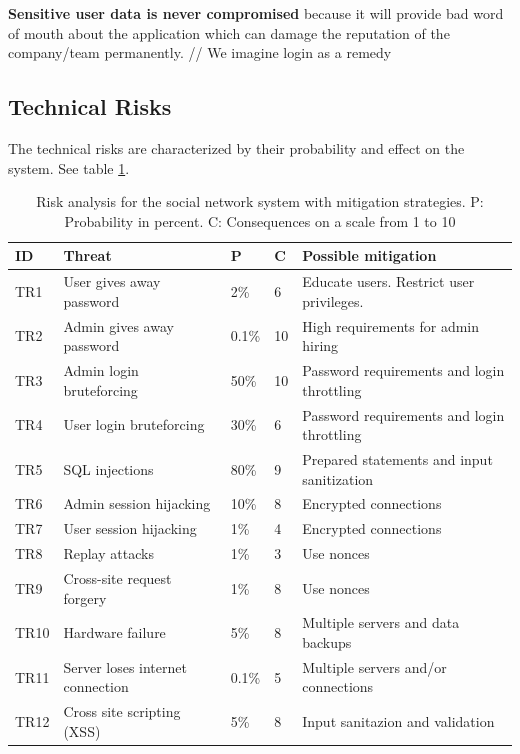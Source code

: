 \documentclass[a4paper]{article}
\begin{document}
\textbf{Sensitive user data is never compromised} because it will provide bad word of mouth about the application which can damage the reputation of the company/team permanently.
// We imagine login as a remedy



\subsection{Technical Risks}
The technical risks are characterized by their probability and effect on the system. See table \ref{tab:risk_analysis}.

\begin{table}[h!]
	\begin{tabular}{| l | p{4cm} | l | l | p{5cm} |}
		\hline
		\textbf{ID} & \textbf{Threat} & \textbf{P} & \textbf{C} & \textbf{Possible mitigation} \\ \hline
		TR1 & User gives away password & 2\% & 6 & Educate users. Restrict user privileges. \\ \hline
        TR2 & Admin gives away password & 0.1\%  & 10 & High requirements for admin hiring \\ \hline
        TR3 & Admin login bruteforcing & 50\% & 10 & Password requirements and login throttling \\ \hline
        TR4 & User login bruteforcing & 30\% & 6 & Password requirements and login throttling \\ \hline
        TR5 & SQL injections & 80\% & 9 & Prepared statements and input sanitization \\ \hline
        TR6 & Admin session hijacking & 10\% & 8 & Encrypted connections \\ \hline
        TR7 & User session hijacking & 1\% & 4 & Encrypted connections \\ \hline
        TR8 & Replay attacks & 1\% & 3 & Use nonces \\ \hline
       	TR9 & Cross-site request forgery & 1\% & 8 & Use nonces \\ \hline
        TR10 & Hardware failure & 5\% & 8 & Multiple servers and data backups \\ \hline
        TR11 & Server loses internet connection & 0.1\% & 5 & Multiple servers and/or connections \\ \hline
        TR12 & Cross site scripting (XSS) & 5\% & 8 & Input sanitazion and validation \\ \hline
	\end{tabular}
	\caption{Risk analysis for the social network system with mitigation strategies. P: Probability in percent. C: Consequences on a scale from 1 to 10}
	\label{tab:risk_analysis}
\end{table}
\end{document}

